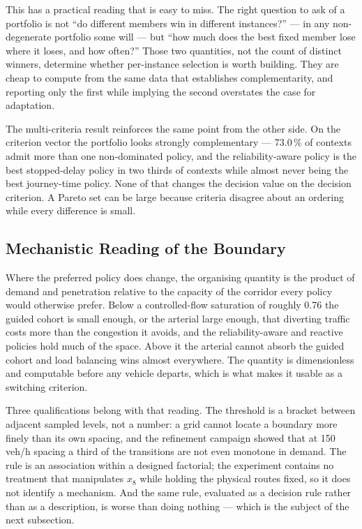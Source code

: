 \documentclass[preprint,12pt]{elsarticle}
\begin{document}
This has a practical reading that is easy to miss. The right question to ask of a
portfolio is not ``do different members win in different instances?'' --- in any
non-degenerate portfolio some will --- but ``how much does the best fixed member
lose where it loses, and how often?'' Those two quantities, not the count of
distinct winners, determine whether per-instance selection is worth building.
They are cheap to compute from the same data that establishes complementarity,
and reporting only the first while implying the second overstates the case for
adaptation.

The multi-criteria result reinforces the same point from the other side. On the
criterion vector the portfolio looks strongly complementary --- 73.0\,\% of
contexts admit more than one non-dominated policy, and the reliability-aware
policy is the best stopped-delay policy in two thirds of contexts while almost
never being the best journey-time policy. None of that changes the decision value
on the decision criterion. A Pareto set can be large because criteria disagree
about an ordering while every difference is small.

\subsection{Mechanistic Reading of the Boundary}
\label{sec:disc:mech}

Where the preferred policy does change, the organising quantity is the product of
demand and penetration relative to the capacity of the corridor every policy would
otherwise prefer. Below a controlled-flow saturation of roughly 0.76 the guided
cohort is small enough, or the arterial large enough, that diverting traffic costs
more than the congestion it avoids, and the reliability-aware and reactive
policies hold much of the space. Above it the arterial cannot absorb the guided
cohort and load balancing wins almost everywhere. The quantity is dimensionless
and computable before any vehicle departs, which is what makes it usable as a
switching criterion.

Three qualifications belong with that reading. The threshold is a bracket between
adjacent sampled levels, not a number: a grid cannot locate a boundary more finely
than its own spacing, and the refinement campaign showed that at 150\,veh/h
spacing a third of the transitions are not even monotone in demand. The rule is an
association within a designed factorial; the experiment contains no treatment that
manipulates $x_8$ while holding the physical routes fixed, so it does not identify
a mechanism. And the same rule, evaluated as a decision rule rather than as a
description, is worse than doing nothing --- which is the subject of the next
subsection.
\end{document}
